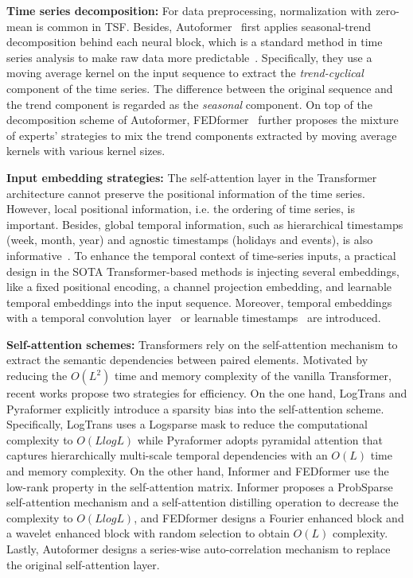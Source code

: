 \noindent\textbf{Time series decomposition:}
For data preprocessing, normalization with zero-mean is common in TSF. Besides, Autoformer~\cite{xu2021autoformer} first applies seasonal-trend decomposition behind each neural block, which is a standard method in time series analysis to make raw data more predictable~\cite{RBCleveland1990STLA,hamilton2020time}. Specifically, they use a moving average kernel on the input sequence to extract the \emph{trend-cyclical} component of the time series. The difference between the original sequence and the trend component is regarded as the \emph{seasonal} component. 
%
On top of the decomposition scheme of Autoformer, FEDformer~\cite{zhou2022fedformer} further proposes the mixture of experts' strategies to mix the trend components extracted by moving average kernels with various kernel sizes. 




\noindent\textbf{Input embedding strategies:}
The self-attention layer in the Transformer architecture cannot preserve the positional information of the time series. However, local positional information, i.e. the ordering of time series, is important. Besides, global temporal information, such as hierarchical timestamps (week, month, year) and agnostic timestamps (holidays and events), is also informative~\cite{informer}.
To enhance the temporal context of time-series inputs, a practical design in the SOTA Transformer-based methods is injecting several embeddings, like a fixed positional encoding, a channel projection embedding, and learnable temporal embeddings into the input sequence. Moreover, temporal embeddings with a temporal convolution layer~\cite{li2019LogTrans} or learnable timestamps~\cite{xu2021autoformer} are introduced. %


\noindent\textbf{Self-attention schemes:}
Transformers rely on the self-attention mechanism to extract the semantic dependencies between paired elements.
%
Motivated by reducing the $O\left(L^{2}\right)$ time and memory complexity of the vanilla Transformer, recent works propose two strategies for efficiency. On the one hand, LogTrans and Pyraformer explicitly introduce a sparsity bias into the self-attention scheme. Specifically, LogTrans uses a Logsparse mask to reduce the computational complexity to $O\left(LlogL\right)$ while Pyraformer adopts pyramidal attention that captures hierarchically multi-scale temporal dependencies with an $O\left(L\right)$ time and memory complexity. On the other hand, Informer and FEDformer use the low-rank property in the self-attention matrix. Informer proposes a ProbSparse self-attention mechanism and a self-attention distilling operation to decrease the complexity to $O\left(LlogL\right)$, and FEDformer designs a Fourier enhanced block and a wavelet enhanced block with random 
selection to obtain $O\left(L\right)$ complexity. Lastly, Autoformer designs a series-wise auto-correlation mechanism to replace the original self-attention layer.


